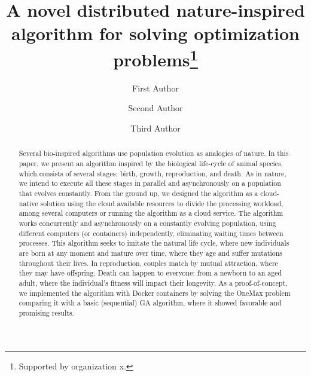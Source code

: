 \documentclass[runningheads]{llncs}
\begin{document}
%
\title{A novel distributed nature-inspired algorithm for solving optimization problems\thanks{Supported by organization x.}}
%
%
\author{First Author \and
Second Author \and
Third Author}
%
%
%
\maketitle              %
%
\begin{abstract}

Several bio-inspired algorithms use population evolution as analogies of
nature. In this paper, we present an algorithm inspired by the biological
life-cycle of animal species, which consists of several stages: birth, growth,
reproduction, and death. As in nature, we intend to execute all these stages in
parallel and asynchronously on a population that evolves constantly. From the
ground up, we designed the algorithm as a cloud-native solution using the cloud
available resources to divide the processing workload, among several computers
or running the algorithm as a cloud service. The algorithm works concurrently
and asynchronously on a constantly evolving population, using different
computers (or containers) independently, eliminating waiting times between
processes. This algorithm seeks to imitate the natural life cycle, where new
individuals are born at any moment and mature over time, where they age and
suffer mutations throughout their lives. In reproduction, couples match by
mutual attraction, where they may have offspring. Death can happen to everyone:
from a newborn to an aged adult, where the individual's fitness will impact
their longevity. As a proof-of-concept, we implemented the algorithm with
Docker containers by solving the OneMax problem comparing it with a basic
(sequential) GA algorithm, where it showed favorable and promising results.

\end{abstract}
\end{document}

